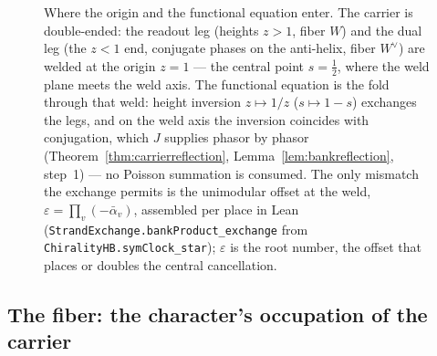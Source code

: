 \begin{figure}[t]
{}
\caption{Where the origin and the functional equation enter. The carrier is
double-ended: the readout leg (heights \(z>1\), fiber \(W\)) and the dual
leg (the \(z<1\) end, conjugate phases on the anti-helix, fiber
\(W^{\vee}\)) are welded at the origin \(z=1\) --- the central point
\(s=\tfrac12\), where the weld plane meets the weld axis. The functional
equation is the fold through that weld: height inversion \(z\mapsto1/z\)
(\(s\mapsto1-s\)) exchanges the legs, and on the weld axis the inversion
coincides with conjugation, which \(J\) supplies phasor by phasor
(Theorem~\ref{thm:carrierreflection}, Lemma~\ref{lem:bankreflection},
step~1) --- no Poisson summation is consumed. The only mismatch the exchange
permits is the unimodular offset at the weld,
\(\varepsilon=\prod_v(-\bar\alpha_v)\), assembled per place in Lean
(\texttt{StrandExchange.bankProduct\_exchange} from
\texttt{ChiralityHB.symClock\_star}); \(\varepsilon\) is the root number,
the offset that places or doubles the central cancellation.}
\label{fig:grh-weld}
\end{figure}

\subsection{The fiber: the character's occupation of the
carrier}\label{sec:grh-buckets}

